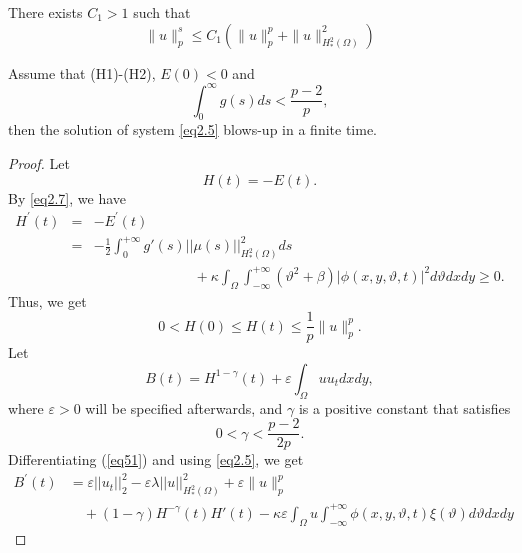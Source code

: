 \documentclass[10pt,a4paper]{amsart}
\begin{document}
\begin{lemma}\label{le5.1}
There exists $C_1>1$ such that
\begin{equation}
\|u\|_{p}^{s} \leq C_1\left(\|u\|_{p}^{p}+\|u\|^2_{H^2_*(\Omega)}\right)
\end{equation}
\end{lemma}

\begin{theorem}\label{teo6.2}
Assume that (H1)-(H2), $E(0)< 0$ and
\begin{equation}\label{eq5.3}
\displaystyle\int_{0}^{\infty} g(s) d s<\frac{p-2}{p},
\end{equation}
then the solution of system \eqref{eq2.5} blows-up in a finite time.
\end{theorem}

\begin{proof}
Let
\begin{equation*}
H(t)= -E(t).
\end{equation*}
By \eqref{eq2.7}, we have
\begin{eqnarray}\label{eq49}
H^{\prime}(t)&=&-E^{\prime}(t)\nonumber\\
&=& -\frac{1}{2} \int_0^{+\infty} g'(s) ||\mu(s)||^2_{H^2_{*}(\Omega)} ds\nonumber\\
&&\hspace{3cm}+\kappa \int_\Omega \int_{-\infty}^{+\infty} (\vartheta^2 + \beta) |\phi(x,y,\vartheta,t)|^2 d\vartheta dx dy \geq 0.
\end{eqnarray}
Thus, we get
\begin{equation}\label{eq5.6}
0 < H(0) \leq H(t) \leq \frac {1}{p}\|u\|_{p}^{p}.
\end{equation}
Let
\begin{equation} \label{eq51}
B(t) = H^{1-\gamma} (t) + \varepsilon \int_\Omega u u_t dx dy,
\end{equation}
where $\varepsilon > 0$ will be specified afterwards, and $\gamma$ is a positive constant that satisfies
\begin{equation}
0 < \gamma < \frac{p-2}{2p}.
\end{equation}
Differentiating (\ref{eq51}) and using \eqref{eq2.5}, we get
\begin{equation}
\begin{split}
B^{\prime}(t)
& =  \varepsilon  ||u_t||_2^2 - \varepsilon \lambda ||u||^2_{H^2_{*}(\Omega)}+\varepsilon\|u\|_{p}^{p}
\\
&\quad +(1 - \gamma) H^{-\gamma}(t) H'(t) -\kappa \varepsilon \int_\Omega u \int_{-\infty}^{+\infty}  \phi(x,y,\vartheta,t)\xi(\vartheta) d\vartheta dx dy

\end{split}
\end{equation}
\end{proof}
\end{document}

